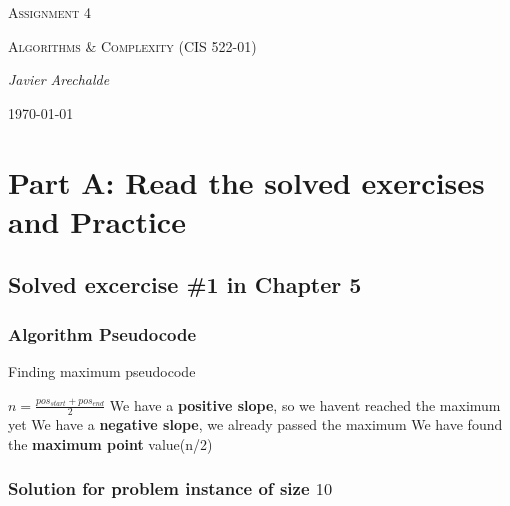 \documentclass{article}
\begin{document}
\begin{titlepage}
	\centering
	{\scshape\LARGE Assignment 4\par}
	\vspace{1cm}
	{\scshape\Large Algorithms \& Complexity (CIS 522-01)\par}
	\vspace{1.5cm}
	{\Large\itshape Javier Arechalde\par}
	\vfill
	{\large \today\par}
\end{titlepage}

\section*{Part A: Read the solved exercises and Practice}

\subsection*{Solved excercise \#1 in Chapter 5}

\subsubsection*{Algorithm Pseudocode}

\begin{algorithm}[H]
\caption{Finding maximum pseudocode}
\begin{algorithmic}[1]
 \State $n = \frac{pos_{start}+pos_{end}}{2}$
  \State We have a \textbf{positive slope}, so we havent reached the maximum yet
  \State {}
  \State We have a \textbf{negative slope}, we already passed the maximum
  \State {}
  \State We have found the \textbf{maximum point}
  \State \Return value(n/2)
 \EndIf
\EndFunction
\end{algorithmic}
\end{algorithm}

\subsubsection*{Solution for problem instance of size $10$}
\end{document}
